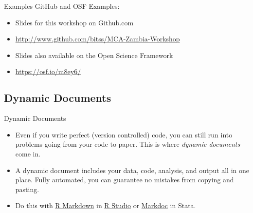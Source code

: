 \documentclass{beamer}
\begin{document}
{    \begin{frame}[plain]
     \end{frame}
}
\begin{frame}{Examples}
GitHub and OSF Examples:
\begin{itemize}
\item
Slides for this workshop on Github.com
\item \url{http://www.github.com/bitss/MCA-Zambia-Workshop}
\item
Slides also available on the Open Science Framework
 \item \url{https://osf.io/m8ey6/}
\end{itemize}
\end{frame}
\subsection{Dynamic Documents}
\begin{frame}{Dynamic Documents}
\begin{itemize}[<+->]
\item
Even if you write perfect (version controlled) code, you can still run into problems going from your code to paper. This is where \textit{dynamic documents} come in.
\item
A dynamic document includes your data, code, analysis, and output all in one place. Fully automated, you can guarantee no mistakes from copying and pasting.
\item
Do this with \href{http://rmarkdown.rstudio.com/}{R Markdown} in \href{https://www.rstudio.com/}{R Studio} or 
\href{http://www.haghish.com/statistics/stata-blog/reproducible-research/markdoc.php}{Markdoc} in Stata.
\end{itemize}
\end{frame}
\end{document}
